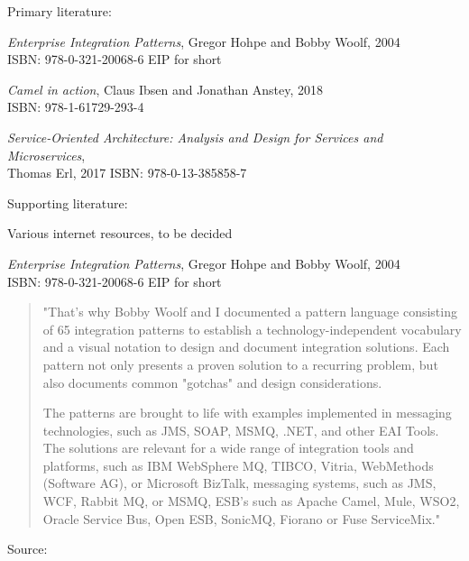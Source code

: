 \documentclass[Screen16to9,17pt]{foils}
\begin{document}

Primary literature:
\begin{list2}
\item \emph{Enterprise Integration Patterns}, Gregor Hohpe and Bobby Woolf, 2004\\
ISBN: 978-0-321-20068-6 EIP for short
\item \emph{Camel in action}, Claus Ibsen and Jonathan Anstey, 2018\\
ISBN: 978-1-61729-293-4
\item \emph{Service‑Oriented Architecture: Analysis and Design for Services and Microservices},\\ Thomas Erl, 2017
ISBN: 978-0-13-385858-7
\end{list2}
Supporting literature:
\begin{list2}
\item Various internet resources, to be decided
\end{list2}





\emph{Enterprise Integration Patterns}, Gregor Hohpe and Bobby Woolf, 2004\\
ISBN: 978-0-321-20068-6 EIP for short



\begin{quote}
"That's why Bobby Woolf and I documented a pattern language consisting of 65 integration patterns to establish a technology-independent vocabulary and a visual notation to design and document integration solutions. Each pattern not only presents a proven solution to a recurring problem, but also documents common "gotchas" and design considerations.

The patterns are brought to life with examples implemented in messaging technologies, such as JMS, SOAP, MSMQ, .NET, and other EAI Tools. The solutions are relevant for a wide range of integration tools and platforms, such as IBM WebSphere MQ, TIBCO, Vitria, WebMethods (Software AG), or Microsoft BizTalk, messaging systems, such as JMS, WCF, Rabbit MQ, or MSMQ, ESB's such as Apache Camel, Mule, WSO2, Oracle Service Bus, Open ESB, SonicMQ, Fiorano or Fuse ServiceMix."
\end{quote}

Source:\\
\end{document}
